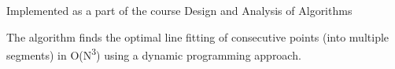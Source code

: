 \label{index_md_src_Readme}%
%
 Implemented as a part of the course Design and Analysis of Algorithms

The algorithm finds the optimal line fitting of consecutive points (into multiple segments) in O(N\textsuperscript{3}) using a dynamic programming approach. 